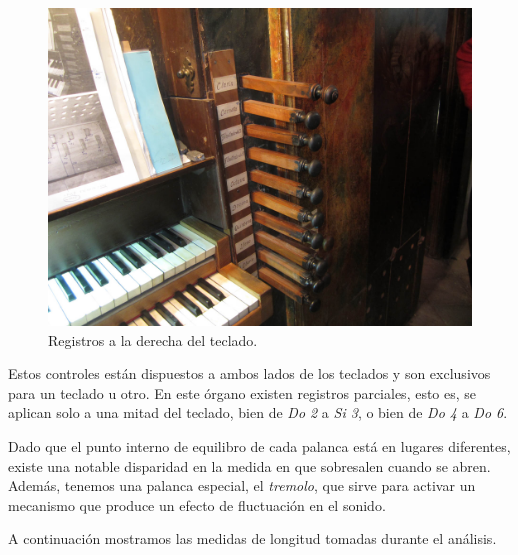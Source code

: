 \begin{figure}[H]
	\noindent \begin{centering}
		\includegraphics[width=\linewidth*2/3]{capitulo3/registros}
		\par\end{centering}
	\smallskip
	\caption{\label{fig:registros} Registros a la derecha del teclado.}
\end{figure} 

\smallskip

Estos controles están dispuestos a ambos lados de los teclados y son exclusivos para un teclado u otro. En este órgano existen registros parciales, esto es, se aplican solo a una mitad del teclado, bien de \textit{Do 2} a \textit{Si 3}, o bien de \textit{Do 4} a \textit{Do 6}.

Dado que el punto interno de equilibro de cada palanca está en lugares diferentes, existe una notable disparidad en la medida en que sobresalen cuando se abren. Además, tenemos una palanca especial, el \textit{tremolo}, que sirve para activar un mecanismo que produce un efecto de fluctuación en el sonido.

A continuación mostramos las medidas de longitud tomadas durante el análisis.

